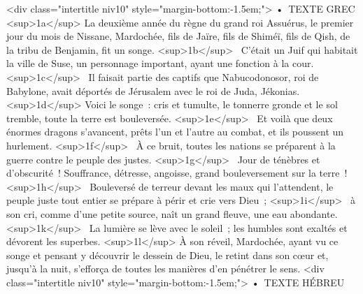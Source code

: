   
  
    
      <div class="intertitle niv10" style="margin-bottom:-1.5em;">
        • TEXTE GREC
      <sup>1a</sup> La deuxième année du règne du grand roi Assuérus, le premier jour du mois de Nissane, Mardochée, fils de Jaïre, fils de Shiméï, fils de Qish, de la tribu de Benjamin, fit un songe. <sup>1b</sup>  C’était un Juif qui habitait la ville de Suse, un personnage important, ayant une fonction à la cour. <sup>1c</sup>  Il faisait partie des captifs que Nabucodonosor, roi de Babylone, avait déportés de Jérusalem avec le roi de Juda, Jékonias.
      <sup>1d</sup> Voici le songe : cris et tumulte, le tonnerre gronde et le sol tremble, toute la terre est bouleversée. <sup>1e</sup>  Et voilà que deux énormes dragons s’avancent, prêts l’un et l’autre au combat, et ils poussent un hurlement. <sup>1f</sup>  À ce bruit, toutes les nations se préparent à la guerre contre le peuple des justes. <sup>1g</sup>  Jour de ténèbres et d’obscurité ! Souffrance, détresse, angoisse, grand bouleversement sur la terre ! <sup>1h</sup>  Bouleversé de terreur devant les maux qui l’attendent, le peuple juste tout entier se prépare à périr et crie vers Dieu ; <sup>1i</sup>  à son cri, comme d’une petite source, naît un grand fleuve, une eau abondante. <sup>1k</sup>  La lumière se lève avec le soleil ; les humbles sont exaltés et dévorent les superbes.
      <sup>1l</sup> À son réveil, Mardochée, ayant vu ce songe et pensant y découvrir le dessein de Dieu, le retint dans son cœur et, jusqu’à la nuit, s’efforça de toutes les manières d’en pénétrer le sens.
      <div class="intertitle niv10" style="margin-bottom:-1.5em;">
        • TEXTE HÉBREU
      
